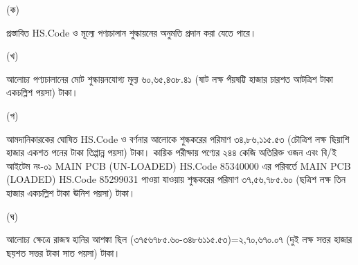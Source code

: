 \documentclass[12pt]{article}
\begin{document}
\begin{minipage}[t]{0.05\linewidth}
(ক)
\end{minipage}
\begin{minipage}[t]{0.90\linewidth}
প্রস্তাবিত HS.Code ও মূল্যে পণ্যচালান শুল্কায়নের অনুমতি প্রদান করা যেতে পারে।
\\
\end{minipage}
\begin{minipage}[t]{0.05\linewidth}
\hspace{0em}
\end{minipage}
\begin{minipage}[t]{0.05\linewidth}
(খ)
\end{minipage}
\begin{minipage}[t]{0.90\linewidth}
আলোচ্য পণ্যচালানের মোট শুল্কায়নযোগ্য
মূল্য ৬০,৬৫,৪৩৮.৪১ (ষাট লক্ষ পঁয়ষট্টি হাজার চারশত আটত্রিশ টাকা একচল্লিশ পয়সা) টাকা।
\\
\end{minipage}
\begin{minipage}[t]{0.05\linewidth}
\hspace{0em}
\end{minipage}
\begin{minipage}[t]{0.05\linewidth}
(গ)
\end{minipage}
\begin{minipage}[t]{0.90\linewidth}
আমদানিকারকের ঘোষিত HS.Code ও বর্ণনার আলোকে শুল্ককরের পরিমাণ
৩৪,৮৬,১১৫.৫৩ (চৌত্রিশ লক্ষ ছিয়াশি হাজার একশত পনের টাকা তিপ্পান্ন পয়সা) টাকা।
কায়িক পরীক্ষায় পণ্যের ২৪৪ কেজি অতিরিক্ত ওজন এবং
বি/ই আইটেম নং-০১ MAIN PCB (UN-LOADED) HS.Code 85340000 এর পরিবর্তে
MAIN PCB (LOADED) HS.Code 85299031
পাওয়া যাওয়ায় শুল্ককরের
পরিমাণ
৩৭,৫৬,৭৮৫.৬০ (ছত্রিশ লক্ষ তিন হাজার একচল্লিশ টাকা ঊনিশ পয়সা) টাকা।
\\
\end{minipage}
\begin{minipage}[t]{0.05\linewidth}
\hspace{0em}
\end{minipage}
\begin{minipage}[t]{0.05\linewidth}
(ঘ)
\end{minipage}
\begin{minipage}[t]{0.90\linewidth}
আলোচ্য ক্ষেত্রে রাজস্ব হানির আশঙ্কা ছিল
(৩৭৫৬৭৮৫.৬০-৩৪৮৬১১৫.৫৩)=২,৭০,৬৭০.০৭
(দুই লক্ষ সত্তর হাজার ছয়শত সত্তর টাকা সাত পয়সা) টাকা।
\\
\end{minipage}
\begin{minipage}[t]{0.05\linewidth}
\hspace{0em}
\end{minipage}
\end{document}
